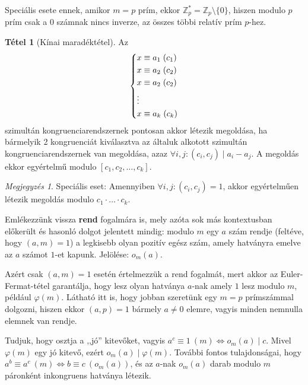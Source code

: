\documentclass[12pt]{book}
\theoremstyle{plain} %
\theoremstyle{definition} %
\newtheorem{theo/}{Tétel}[section]
\newenvironment{theo}
  {\renewcommand{\qedsymbol}{$\clubsuit$}%
   \pushQED{\qed}\begin{theo/}}
  {\popQED\end{theo/}}
\theoremstyle{remark}
\newtheorem*{mj}{Megjegyzés}
\renewcommand\qedsymbol{$\blacksquare$}
\numberwithin{equation}{section}  %
\begin{document}
	Speciális esete ennek, amikor $m=p$ prím, ekkor $\mathbb{Z}_p^{*} = \mathbb{Z}_p \setminus \{0\} $, hiszen modulo $p$ prím csak a $0$ számnak nincs inverze, az összes többi relatív prím $p$-hez. 
	
	\begin{theo}[Kínai maradéktétel]
		Az
		\[
		\begin{cases*}
		x \equiv a_1 \hspace{1mm} (c_1) \\
		x \equiv a_2 \hspace{1mm} (c_2) \\
		x \equiv a_2 \hspace{1mm} (c_2) \\
		\vdots \\
		x \equiv a_k \hspace{1mm} (c_k) \\
		\end{cases*}
		\]
		szimultán kongruenciarendszernek pontosan akkor létezik megoldása, ha bármelyik 2 kongruenciát kiválasztva az általuk alkotott szimultán kongruenciarendszernek van megoldása, azaz $\forall i,j\colon (c_i,c_j)\mid a_i-a_j$. A megoldás ekkor egyértelmű modulo $[c_1,c_2,\ldots, c_k]$.
	\end{theo}

	\begin{mj}
		Speciális eset: Amennyiben $\forall i,j\colon (c_i,c_j)=1$, akkor egyértelműen létezik megoldás modulo $c_1\cdot \ldots \cdot c_k$.
	\end{mj}
	
	Emlékezzünk vissza \textbf{rend} fogalmára is, mely azóta sok más kontextusban előkerült és hasonló dolgot jelentett mindig: modulo $m$ egy $a$ szám rendje (feltéve, hogy $(a,m)=1$) a legkisebb olyan pozitív egész szám, amely hatványra emelve az $a$ számot $1$-et kapunk. Jelölése: $o_m(a)$.
	
	Azért csak $(a,m)=1$ esetén értelmezzük a rend fogalmát, mert akkor az Euler-Fermat-tétel garantálja, hogy lesz olyan hatványa $a$-nak amely $1$ lesz modulo $m$, például $\varphi(m)$. Látható itt is, hogy jobban szeretünk egy $m=p$ prímszámmal dolgozni, hiszen ekkor $(a,p)=1$ bármely $a\neq 0$ elemre, vagyis minden nemnulla elemnek van rendje.
	
	Tudjuk, hogy osztja a ,,jó'' kitevőket, vagyis $a^c \equiv 1 \ (m) \Leftrightarrow o_m(a)\mid c$. Mivel $\varphi(m)$ egy jó kitevő, ezért $o_m(a)\mid \varphi(m)$. További fontos tulajdonságai, hogy $a^b\equiv a^c\ (m) \Leftrightarrow b\equiv c \ (o_m(a))$, és az $a$-nak $o_m(a)$ darab modulo $m$ páronként inkongruens hatványa létezik.
	
\end{document}
